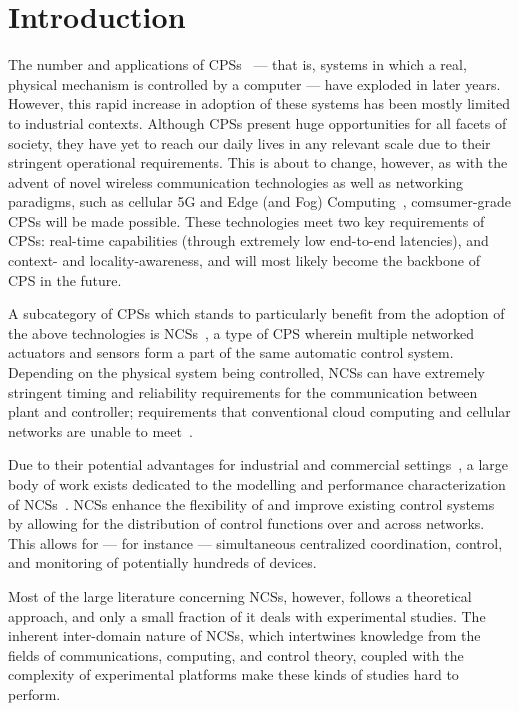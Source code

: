 \section{Introduction}\label{sec:intro}

The number and applications of \acp{CPS}~\cite{Rajkumar2010CPS} --- that is, systems in which a real, physical mechanism is controlled by a computer --- have exploded in later years.
However, this rapid increase in adoption of these systems has been mostly limited to industrial contexts.
Although \acp{CPS} present huge opportunities for all facets of society, they have yet to reach our daily lives in any relevant scale due to their stringent operational requirements.
This is about to change, however, as with the advent of novel wireless communication technologies as well as networking paradigms, such as cellular 5G and Edge (and Fog) Computing~\cite{Satya2009Case,Satya2017Emergence}, comsumer-grade \acp{CPS} will be made possible.
These technologies meet two key requirements of \acp{CPS}: real-time capabilities (through extremely low end-to-end latencies), and context- and locality-awareness, and will most likely become the backbone of \ac{CPS} in the future.

A subcategory of \acp{CPS} which stands to particularly benefit from the adoption of the above technologies is \acp{NCS}~\cite{Gupta2010NCSOverview}, a type of \ac{CPS} wherein multiple networked actuators and sensors form a part of the same automatic control system.
Depending on the physical system being controlled, \acp{NCS} can have extremely stringent timing and reliability requirements for the communication between plant and controller; requirements that conventional cloud computing and cellular networks are unable to meet~\cite{Liu2017Review,Wan2020Efficient}.

Due to their potential advantages for industrial and commercial settings~\cite{Lu2015WSAN}, a large body of work exists dedicated to the modelling and performance characterization of \aclp{NCS}~\cite{Hespanha2007Survey,Zhang2013Survey,Zhang2016Survey}.
\Acp{NCS} enhance the flexibility of and improve existing control systems by allowing for the distribution of control functions over and across networks.
This allows for --- for instance --- simultaneous centralized coordination, control, and monitoring of potentially hundreds of devices.

Most of the large literature concerning \acp{NCS}, however, follows a theoretical approach, and only a small fraction of it deals with experimental studies.
The inherent inter-domain nature of \acp{NCS}, which intertwines knowledge from the fields of communications, computing, and control theory, coupled with the complexity of experimental platforms make these kinds of studies hard to perform.

